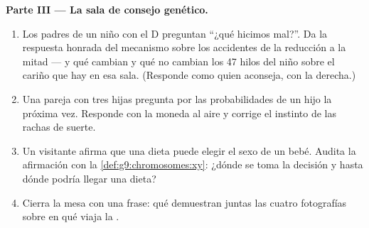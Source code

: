 \begin{problem}
\medskip\noindent\textbf{Parte III --- La sala de consejo
genético.}
\begin{enumerate}[resume]
  \item Los padres de un niño con el  D preguntan ``¿qué
        hicimos mal?''. Da la respuesta honrada del mecanismo sobre los
        accidentes de la reducción a la mitad --- y qué cambian y qué
        no cambian los 47 hilos del niño sobre el cariño que hay en esa
        sala. (Responde como quien aconseja, con la  derecha.)
  \item Una pareja con tres hijas pregunta por las probabilidades de un
        hijo la próxima vez. Responde con la moneda al aire y corrige
        el instinto de las rachas de suerte.
  \item Un visitante afirma que una dieta puede elegir el sexo de un
        bebé. Audita la afirmación con la
        \cref{def:g9:chromosomes:xy}: ¿dónde se toma la decisión y
        hasta dónde podría llegar una dieta?
  \item Cierra la mesa con una frase: qué demuestran juntas las cuatro
        fotografías sobre en qué viaja la .
\end{enumerate}
\end{problem}
